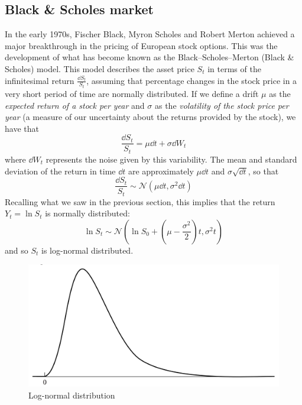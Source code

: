 \subsection{Black \& Scholes market} %
In the early 1970s, Fischer Black, Myron Scholes and Robert Merton achieved a major breakthrough in the pricing of European stock options. This was the development of what has become known as the Black–Scholes–Merton (Black \& Scholes) model.
This model describes the asset price $S_t$ in terms of the infinitesimal return $\frac{\dd S_t}{S_t}$, assuming that percentage changes in the stock price in a very short period of time are normally distributed. If we define a drift $\mu$ as the \emph{expected return of a stock per year}  and $\sigma$ as the \emph{volatility of the stock price per year} (a measure of our uncertainty about the returns provided by the stock), we have that
\begin{equation}\label{bs}
    \frac{\dd S_t}{S_t} = \mu \dd t + \sigma\dd W_t
\end{equation}
where $\dd W_t$ represents the noise given by this variability. The mean and standard deviation of the return in time $\dd t$ are approximately $\mu\dd t$ and $\sigma\sqrt{\dd t}$, so that
\begin{equation}
    \frac{\dd S_t}{S_t} \sim \mathcal{N}(\mu\dd t, \sigma^2\dd t)
\end{equation}
Recalling what we saw in the previous section, this implies that the return $Y_t = \ln S_t$ is normally distributed:
\begin{equation}
    \ln S_t \sim\mathcal{N}\left(\ln S_0+\left(\mu-\dfrac{\sigma^2}{2}\right)t,\sigma^2 t\right)
\end{equation}
and so $S_t$ is log-normal distributed.
\begin{figure}[htp]
    \centering
    \includegraphics[scale=0.2]{fig/log_norm_distr.png}
    \caption{Log-normal distribution}
    \label{fig:lognorm}
\end{figure}
